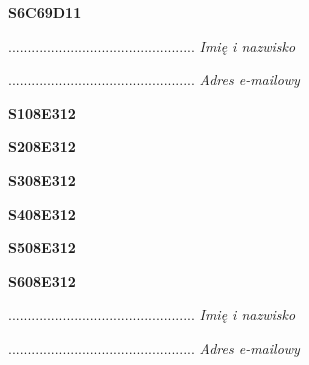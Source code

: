 \begin{turn}{90}\huge \textbf{S6C69D11}\end{turn}

\begin{turn}{90}\begin{minipage}{\linewidth} \vspace{20mm} ................................................  \textit{Imię i nazwisko}\end{minipage}\end{turn}

\begin{turn}{90}\begin{minipage}{\linewidth} \vspace{20mm} ................................................  \textit{Adres e-mailowy}\end{minipage}\end{turn}

\begin{turn}{90}\huge \textbf{S108E312}\end{turn}

\begin{turn}{90}\huge \textbf{S208E312}\end{turn}

\begin{turn}{90}\huge \textbf{S308E312}\end{turn}

\begin{turn}{90}\huge \textbf{S408E312}\end{turn}

\begin{turn}{90}\huge \textbf{S508E312}\end{turn}

\begin{turn}{90}\huge \textbf{S608E312}\end{turn}

\begin{turn}{90}\begin{minipage}{\linewidth} \vspace{20mm} ................................................  \textit{Imię i nazwisko}\end{minipage}\end{turn}

\begin{turn}{90}\begin{minipage}{\linewidth} \vspace{20mm} ................................................  \textit{Adres e-mailowy}\end{minipage}\end{turn}

